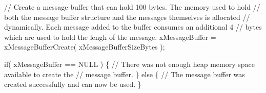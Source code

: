\begin{DoxyPre}    // Create a message buffer that can hold 100 bytes.  The memory used to hold
    // both the message buffer structure and the messages themselves is allocated
    // dynamically.  Each message added to the buffer consumes an additional 4
    // bytes which are used to hold the lengh of the message.
    xMessageBuffer = xMessageBufferCreate( xMessageBufferSizeBytes );\end{DoxyPre}



\begin{DoxyPre}    if( xMessageBuffer == NULL )
    \{
        // There was not enough heap memory space available to create the
        // message buffer.
    \}
    else
    \{
        // The message buffer was created successfully and can now be used.
    \}\end{DoxyPre}



\begin{DoxyPre}\end{DoxyPre}
 